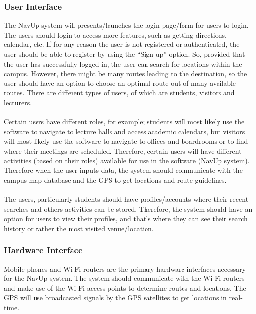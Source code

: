 \documentclass[12pt, a4paper]{article}
\begin{document}
		\subsubsection{User Interface}
The NavUp system will presents/launches the login page/form for users to login. The users should login to access more features, such as getting directions, calendar, etc. If for any reason the user is not registered or authenticated, the user should be able to register by using the “Sign-up” option. So, provided that the user has successfully logged-in, the user can search for locations within the campus. However, there might be many routes leading to the destination, so the user should have an option to choose an optimal route out of many available routes. There are different types of users, of which are students, visitors and lecturers.\\\\
Certain users have different roles, for example; students will most likely use the software to navigate to lecture halls and access academic calendars, but visitors will most likely use the software to navigate to offices and boardrooms or to find where their meetings are scheduled. Therefore, certain users will have different activities (based on their roles) available for use in the software (NavUp system). Therefore when the user inputs data, the system should communicate with the campus map database and the GPS to get locations and route guidelines.\\\\
The users, particularly students should have profiles/accounts where their recent searches and others activities can be stored. Therefore, the system should have an option for users to view their profiles, and that’s where they can see their search history or rather the most visited venue/location. \\
		\subsubsection{Hardware Interface}
Mobile phones and Wi-Fi routers are the primary hardware interfaces necessary for the NavUp system. The system should communicate with the Wi-Fi routers and make use of the Wi-Fi access points to determine routes and locations. The GPS will use broadcasted signals by the GPS satellites to get locations in real-time. \\
\end{document}

